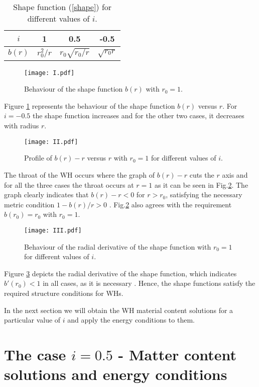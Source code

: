 \documentclass[twocolumn,showpacs,aps,amssymb,floatfix,prd,amsmath,preprintnumbers]{revtex4}
\begin{document}
\begin{table}[h]
\begin{tabular}{|c|c|c|c|}
  \hline
  $i$ & 1 & 0.5 & -0.5 \\\hline
  $b(r)$ & $r_0^2/r$ & $r_0\sqrt{r_0/r}$ & $\sqrt{r_0r}$ \\
   \hline
\end{tabular}
\caption{Shape function (\ref{shape}) for different values of $i$.}
\end{table}

\begin{figure}[h]
\centering
\texttt{[image: I.pdf]}
\caption{Behaviour of the shape function $b(r)$ with $r_0=1$.}\label{figI}
\end{figure}

Figure \ref{figI} represents the behaviour of the shape function $b(r)$ versus $r$. For $i=-0.5$ the shape function  increases and for the other two cases, it decreases with radius $r$.

\begin{figure}[h]
\centering
\texttt{[image: II.pdf]}
\caption{Profile of $b(r)-r$ versus $r$ with $r_0=1$ for different values of $i$.}\label{figII}
\end{figure}

The throat of the WH occurs where the graph of $b(r)-r$ cuts the $r$ axis and for all the three cases the throat occurs at $r=1$ as it can be seen in Fig.\ref{figII}. The graph clearly indicates that $b(r)-r <0$ for $r>r_0$, satisfying the necessary metric condition $1-b(r)/r >0$ \cite{morris/1988}. Fig.\ref{figII} also agrees with the requirement $b(r_0)=r_0$ \cite{morris/1988} with $r_0=1$.
 
\begin{figure}[h]
\centering
\texttt{[image: III.pdf]}
\caption{Behaviour of the radial derivative of the shape function with $r_0=1$ for different values of $i$.}\label{figIII}
\end{figure}

Figure \ref{figIII} depicts the radial derivative of the shape function, which indicates $b'(r_0)< 1$ in all cases, as it is necessary \cite{morris/1988}. Hence, the shape functions satisfy the required structure conditions for WHs.

In the next section we will obtain the WH material content solutions for a particular value of $i$ and apply the energy conditions to them.

\section{The case $i=0.5$ - Matter content solutions and energy conditions}\label{sec:EC}
\end{document}

